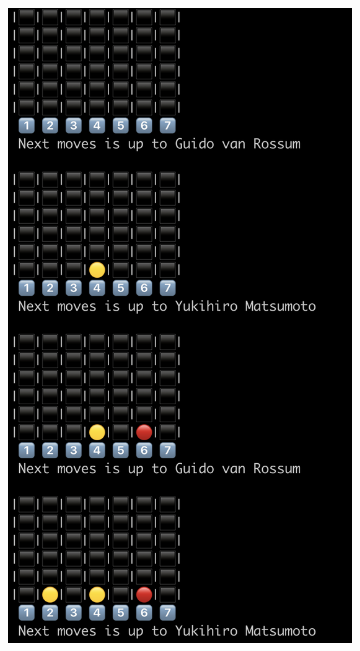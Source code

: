 \documentclass{article}
\begin{document}
  \begin{figure}
    \centering
    
    \begin{subfigure}{0.4\textwidth}
      \includegraphics[width=\linewidth]{img/gamestart.png}
      \subcaption{}
    \end{subfigure}\hfil
    \begin{subfigure}{0.4\textwidth}

\end{subfigure}
\end{figure}
\end{document}
